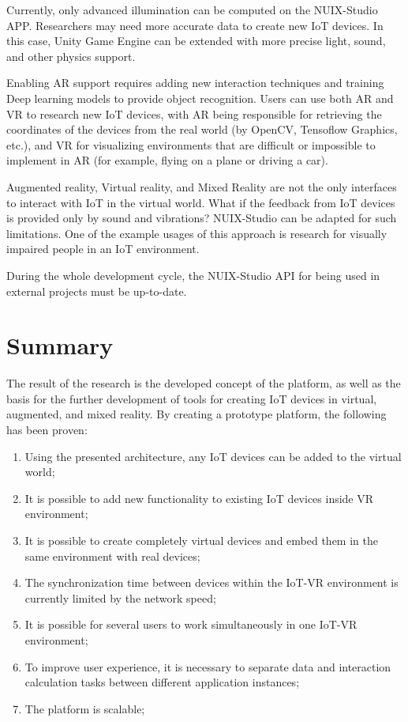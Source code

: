 Currently, only advanced illumination can be computed on the NUIX-Studio APP. Researchers may need more accurate data to create new IoT devices. In this case, Unity Game Engine can be extended with more precise light, sound, and other physics support.

Enabling AR support requires adding new interaction techniques and training Deep learning models to provide object recognition. Users can use both AR and VR to research new IoT devices, with AR being responsible for retrieving the coordinates of the devices from the real world (by OpenCV, Tensoflow Graphics, etc.), and VR for visualizing environments that are difficult or impossible to implement in AR (for example, flying on a plane or driving a car).

Augmented reality, Virtual reality, and Mixed Reality are not the only interfaces to interact with IoT in the virtual world. What if the feedback from IoT devices is provided only by sound and vibrations? NUIX-Studio can be adapted for such limitations. One of the example usages of this approach is research for visually impaired people in an IoT environment.

During the whole development cycle, the NUIX-Studio API for being used in external projects must be up-to-date. 

\section{Summary}

The result of the research is the developed concept of the platform, as well as the basis for the further development of tools for creating IoT devices in virtual, augmented, and mixed reality. By creating a prototype platform, the following has been proven:
\begin{enumerate}
    \item Using the presented architecture, any IoT devices can be added to the virtual world;
    \item It is possible to add new functionality to existing IoT devices inside VR environment;
    \item It is possible to create completely virtual devices and embed them in the same environment with real devices;
    \item The synchronization time between devices within the IoT-VR environment is currently limited by the network speed;
    \item It is possible for several users to work simultaneously in one IoT-VR environment;
    \item To improve user experience, it is necessary to separate data and interaction calculation tasks between different application instances;
    \item The platform is scalable;
\end{enumerate}


